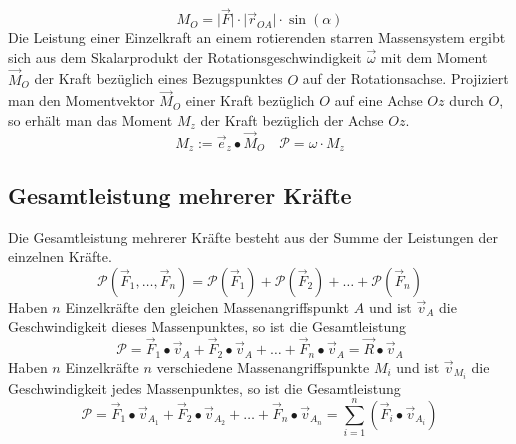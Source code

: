 \begin{equation}
\boxed{M_O=\Big\vert\overrightarrow{F}\Big\vert\cdot \Big\vert\overrightarrow{r}_{OA}\Big\vert\cdot \sin\left(\alpha\right)}
\end{equation}
Die Leistung einer Einzelkraft an einem rotierenden starren Massensystem ergibt sich aus dem Skalarprodukt der Rotationsgeschwindigkeit $\overrightarrow{\omega}$ mit dem Moment $\overrightarrow{M}_O$ der Kraft bezüglich eines Bezugspunktes $O$ auf der Rotationsachse.
\newline\newline
Projiziert man den Momentvektor $\overrightarrow{M}_O$ einer Kraft bezüglich $O$ auf eine Achse $Oz$ durch $O$, so erhält man das Moment $M_z$ der Kraft bezüglich der Achse $Oz$.
\begin{equation}
\boxed{M_z:=\overrightarrow{e}_z\bullet \overrightarrow{M}_O}\quad \boxed{\mathcal{P}=\omega\cdot M_z}
\end{equation}
\subsection{Gesamtleistung mehrerer Kräfte}
Die Gesamtleistung mehrerer Kräfte besteht aus der Summe der Leistungen der einzelnen Kräfte.
\begin{equation}
\boxed{\mathcal{P}\left(\overrightarrow{F}_1, \dotso, \overrightarrow{F}_n\right)=\mathcal{P}\left(\overrightarrow{F}_1\right)+\mathcal{P}\left(\overrightarrow{F}_2\right)+\dotso + \mathcal{P}\left(\overrightarrow{F}_n\right)}
\end{equation}
Haben $n$ Einzelkräfte den gleichen Massenangriffspunkt $A$ und ist $\overrightarrow{v}_A$ die Geschwindigkeit dieses Massenpunktes, so ist die Gesamtleistung
\begin{equation}
\boxed{\mathcal{P}=\overrightarrow{F}_1\bullet \overrightarrow{v}_A+\overrightarrow{F}_2\bullet \overrightarrow{v}_A+\dotso+\overrightarrow{F}_n\bullet \overrightarrow{v}_A=\overrightarrow{R}\bullet \overrightarrow{v}_A}
\end{equation}
Haben $n$ Einzelkräfte $n$ verschiedene Massenangriffspunkte $M_i$ und ist $\overrightarrow{v}_{M_i}$ die Geschwindigkeit jedes Massenpunktes, so ist die Gesamtleistung
\begin{equation}
\boxed{\mathcal{P}=\overrightarrow{F}_1\bullet \overrightarrow{v}_{A_1}+\overrightarrow{F}_2\bullet \overrightarrow{v}_{A_2}+\dotso+\overrightarrow{F}_n\bullet \overrightarrow{v}_{A_n}=\displaystyle \sum_{i=1}^n\left(\overrightarrow{F}_i\bullet \overrightarrow{v}_{A_i}\right)}
\end{equation}
